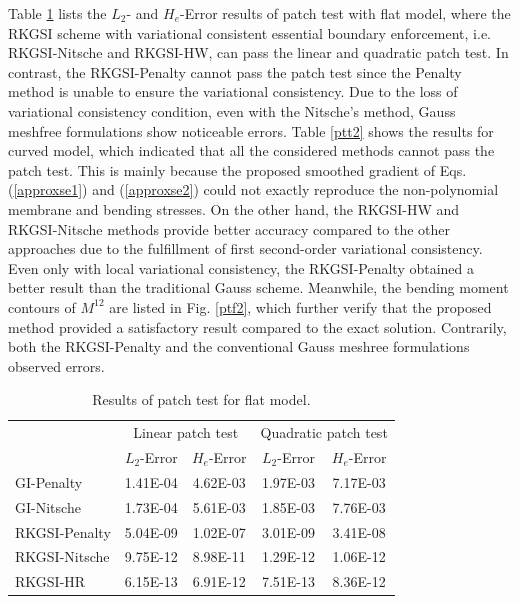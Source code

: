 Table \ref{ptt1} lists the $L_2$- and $H_e$-Error results of patch test with flat model, where the RKGSI scheme with variational consistent essential boundary enforcement, i.e. RKGSI-Nitsche and RKGSI-HW, can pass the linear and quadratic patch test. In contrast, the RKGSI-Penalty cannot pass the patch test since the Penalty method is unable to ensure the variational consistency. Due to the loss of variational consistency condition, even with the Nitsche's method, Gauss meshfree formulations show noticeable errors. Table \ref{ptt2} shows the results for curved model, which indicated that all the considered methods cannot pass the patch test. This is mainly because the proposed smoothed gradient of Eqs. (\ref{approxse1}) and (\ref{approxse2}) could not exactly reproduce the non-polynomial membrane and bending stresses. On the other hand, the RKGSI-HW and RKGSI-Nitsche methods provide better accuracy compared to the other approaches due to the fulfillment of first second-order variational consistency. Even only with local variational consistency, the RKGSI-Penalty obtained a better result than the traditional Gauss scheme. Meanwhile, the bending moment contours of $M^{12}$ are listed in Fig. \ref{ptf2}, which further verify that the proposed method provided a satisfactory result compared to the exact solution. Contrarily, both the RKGSI-Penalty and the conventional Gauss meshree formulations observed errors.

\begin{table}[!ht]
\centering
\caption{Results of patch test for flat model.}\label{ptt1}
\begin{tabular}{lcccc}
\toprule
 & \multicolumn{2}{c}{Linear patch test} & \multicolumn{2}{c}{Quadratic patch test} \\ \cline{2-5}
 & $L_2$-Error & $H_e$-Error & $L_2$-Error & $H_e$-Error \\
    \midrule
    GI-Penalty & 1.41E-04 & 4.62E-03 & 1.97E-03 & 7.17E-03 \\
    GI-Nitsche & 1.73E-04 & 5.61E-03 & 1.85E-03 & 7.76E-03 \\
    RKGSI-Penalty & 5.04E-09 & 1.02E-07 & 3.01E-09 & 3.41E-08 \\
    RKGSI-Nitsche & 9.75E-12 & 8.98E-11 & 1.29E-12 & 1.06E-12 \\
    RKGSI-HR & 6.15E-13 & 6.91E-12 & 7.51E-13 & 8.36E-12 \\
    \bottomrule
\end{tabular}
\end{table}

